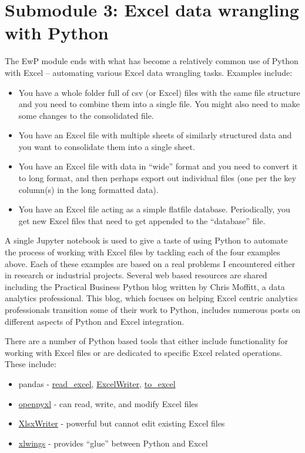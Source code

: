 \documentclass[ited,blindrev]{informs3}              %
\begin{document}
\section{Submodule 3: Excel data wrangling with Python}

The EwP module ends with what has become a relatively common use of Python with Excel -- automating various Excel data wrangling tasks. Examples include:

\begin{itemize}
	\item
	You have a whole folder full of csv (or Excel) files with the same
	file structure and you need to combine them into a single file. You
	might also need to make some changes to the consolidated file.
	\item
	You have an Excel file with multiple sheets of similarly structured
	data and you want to consolidate them into a single sheet.
	\item
	You have an Excel file with data in ``wide'' format and you need to
	convert it to long format, and then perhaps export out individual
	files (one per the key column(s) in the long formatted data).
	\item
	You have an Excel file acting as a simple flatfile database.
	Periodically, you get new Excel files that need to get appended to the
	``database'' file.
\end{itemize}

A single Jupyter notebook is used to give a taste of using Python to automate the process of working with Excel files by tackling each of the four examples above. Each of these examples are based on a real problems I encountered either in research or industrial projects. Several web based resources are shared including the Practical Business Python blog \cite{bibid} written by Chris Moffitt, a data analytics professional. This blog, which focuses on helping Excel centric analytics professionals transition some of their work to Python, includes numerous posts on different aspects of Python and Excel integration.  

There are a number of Python based tools that either include functionality for working with Excel files or are dedicated to specific Excel related operations. These include:

\begin{itemize}
	\item
	pandas -
	\href{https://pandas.pydata.org/docs/reference/api/pandas.read_excel.html}{read\_excel},
	\href{https://pandas.pydata.org/docs/reference/api/pandas.ExcelWriter.html}{ExcelWriter},
	\href{https://pandas.pydata.org/docs/reference/api/pandas.DataFrame.to_excel.html}{to\_excel}
	\item
	\href{https://openpyxl.readthedocs.io/en/stable/}{openpyxl} - can
	read, write, and modify Excel files
	\item
	\href{https://xlsxwriter.readthedocs.io/}{XlsxWriter} - powerful but
	cannot edit existing Excel files
	\item
	\href{https://www.xlwings.org/}{xlwings} - provides ``glue'' between
	Python and Excel
\end{itemize}
\end{document}
